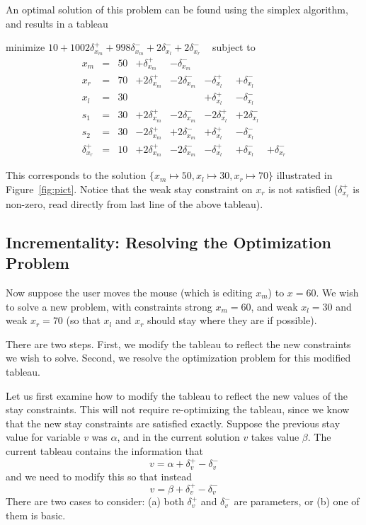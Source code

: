 \documentclass{article}
\newcommand{\strength}{\sf}
\begin{document}
An optimal solution of this problem can be found using the simplex algorithm,
and results in a tableau
\begin{trivlist}\item
minimize $10 + 1002 \delta_{x_m}^+ + 998 \delta_{x_m}^-  + 2
\delta_{x_l}^- + 2\delta_{x_r}^- $ 
~ subject to 
$$
\begin{array}{rlrrrrrr} 
x_m & = &50 &  + \delta_{x_m}^+ & - \delta_{x_m}^- \\
x_r & = &70 & + 2 \delta_{x_m}^+ & - 2\delta_{x_m}^- &
                - \delta_{x_l}^+ & + \delta_{x_l}^- \\ \hline
x_l & = & 30  & & & + \delta_{x_l}^+ & - \delta_{x_l}^- \\
s_1 & = &30 &  + 2 \delta_{x_m}^+ & - 2\delta_{x_m}^- &
                -2 \delta_{x_l}^+ & +2 \delta_{x_l}^- \\
s_2 & = &30 &   - 2 \delta_{x_m}^+ &+2\delta_{x_m}^- &
                + \delta_{x_l}^+ & - \delta_{x_l}^- \\
\delta_{x_r}^+ & = & 10 & + 2 \delta_{x_m}^+  & - 2\delta_{x_m}^- &
        - \delta_{x_l}^+ & + \delta_{x_l}^- & +\delta_{x_r}^-
\end{array}
$$
\end{trivlist}
This corresponds to the solution
$\{x_m \mapsto 50, x_l \mapsto 30, x_r \mapsto 70\}$
illustrated in Figure~\ref{fig:pict}.
Notice that the weak stay constraint on $x_r$ is not satisfied
($\delta_{x_r}^+$ is non-zero, read directly from last line of the above tableau).

\subsection{Incrementality: Resolving the Optimization Problem}
\label{resolving}

Now suppose the user moves the mouse (which
is editing $x_m$) to $x=60$.
We wish to solve a new problem, with
constraints {\strength strong} $x_m = 60$, and
{\strength weak} $x_l = 30$ and {\strength weak} $x_r = 70$
(so that $x_l$ and $x_r$ should stay where they are if possible).


There are two steps.  First, we modify the tableau to reflect the new
constraints we wish to solve.  Second, we resolve the optimization problem
for this modified tableau.

Let us first examine how to modify the tableau to reflect the new values of
the stay constraints.  This will not require re-optimizing the tableau,
since we know that the new stay constraints are satisfied exactly.
Suppose the previous stay value for variable $v$ was $\alpha$, and in the
current solution $v$ takes value $\beta$.  The current tableau contains the
information that 
$$v = \alpha + \delta_v^+ - \delta_v^-$$
and we need to
modify this so that instead 
$$v = \beta + \delta_v^+ - \delta_v^-$$
There
are two cases to consider: (a) both $\delta_v^+$ and $\delta_v^-$ are
parameters, or (b) one of them is basic.
\end{document}
